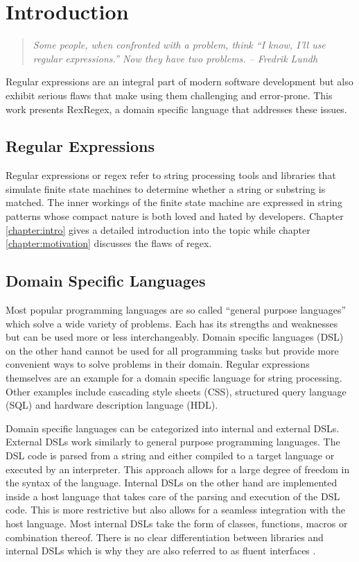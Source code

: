 \chapter{Introduction} \label{chapter:introtoall}

\begin{quote}
\emph{
Some people, when confronted with a problem, think
\enquote{I know, I'll use regular expressions.} Now they have two problems. -- Fredrik Lundh \cite{NowTwoProblems}
    }
\end{quote}

Regular expressions are an integral part of modern software development but also exhibit serious flaws that make using them challenging and error-prone. This work presents RexRegex, a domain specific language that addresses these issues.

\section{Regular Expressions}

Regular expressions or regex refer to string processing tools and libraries that simulate finite state machines to determine whether a string or substring is matched. The inner workings of the finite state machine are expressed in string patterns whose compact nature is both loved and hated by developers. Chapter \ref{chapter:intro} gives a detailed introduction into the topic while chapter \ref{chapter:motivation} discusses the flaws of regex.

\section{Domain Specific Languages}

Most popular programming languages are so called \enquote{general purpose languages} which solve a wide variety of problems. Each has its strengths and weaknesses but can be used more or less interchangeably. Domain specific languages (DSL) on the other hand cannot be used for all programming tasks but provide more convenient ways to solve problems in their domain. Regular expressions themselves are an example for a domain specific language for string processing. Other examples include cascading style sheets (CSS), structured query language (SQL) and hardware description language (HDL).

Domain specific languages can be categorized into internal and external DSLs. External DSLs work similarly to general purpose programming languages. The DSL code is parsed from a string and either compiled to a target language or executed by an interpreter. This approach allows for a large degree of freedom in the syntax of the language. Internal DSLs on the other hand are implemented inside a host language that takes care of the parsing and execution of the DSL code. This is more restrictive but also allows for a seamless integration with the host language. Most internal DSLs take the form of classes, functions, macros or combination thereof. There is no clear differentiation between libraries and internal DSLs which is why they are also referred to as fluent interfaces \cite{FluentInterfacesFowler}.

